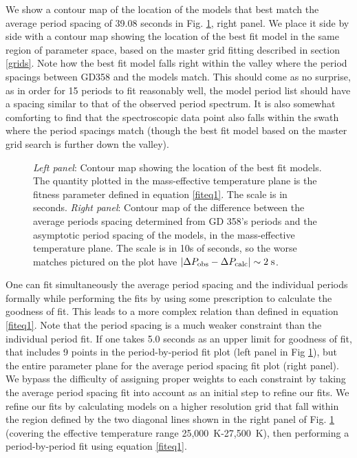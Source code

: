 \documentclass[12pt,preprint]{aastex}
\begin{document}
We show a contour map of the location of the models that best match the average period spacing of 
39.08 seconds in Fig. \ref{ffit2}, right panel. We place it side by side with a contour map showing 
the location of the best fit model in the same region of parameter space, based on the master grid 
fitting described in section \ref{grids}. Note how the best fit model falls right within the valley 
where the period spacings between GD358 and the models match. This should come as no surprise, as in 
order for 15 periods to fit reasonably well, the model period list should have a spacing similar to 
that of the observed period spectrum. It is also somewhat comforting to find that the spectroscopic 
data point also falls within the swath where the period spacings match (though the best fit model 
based on the master grid search is further down the valley).

\begin{figure}
\caption{
{\it Left panel}: Contour map showing the location of the best fit models. The quantity plotted in 
the mass-effective temperature plane is the fitness parameter defined in equation \ref{fiteq1}. 
The scale is in seconds. {\it Right panel}: Contour map of the difference between the average 
periods spacing determined from GD 358's periods and the asymptotic period spacing of the models, 
in the mass-effective temperature plane. The scale is in 10s of seconds, so the worse matches 
pictured on the plot have $\left|\Delta P_{\rm obs}- \Delta P_{\rm calc}\right| \sim 2 \; \rm s$. \label{ffit2}
}
\end{figure}

One can fit simultaneously the average period spacing and the individual periods 
formally while performing the fits by using some prescription to calculate the goodness of fit. 
This leads to a more complex relation than defined in equation \ref{fiteq1}. 
Note that the period spacing is a much weaker constraint than the individual period fit. 
If one takes 5.0 seconds as an upper limit for goodness of fit, that includes 9 points in the 
period-by-period fit plot (left panel in Fig \ref{ffit2}), but the entire parameter plane 
for the average period spacing fit plot (right panel). We bypass the difficulty of 
assigning proper weights to each constraint by taking the average period spacing fit into 
account as an initial step to refine our fits. We refine our fits by calculating models on 
a higher resolution grid that fall within the region defined by the two diagonal lines shown 
in the right panel of Fig. \ref{ffit2} (covering the effective temperature range 25,000~K-27,500~K), then performing a period-by-period fit using 
equation \ref{fiteq1}.
\end{document}
